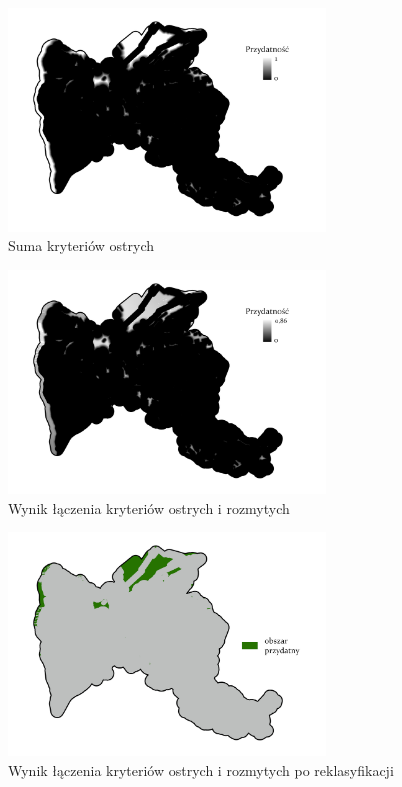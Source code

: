 \documentclass{article}
\begin{document}
\begin{figure}[H]
    \centering
    \includegraphics[width=0.75\textwidth]{img/ostre-layout.jpg}
    \caption*{Suma kryteriów ostrych}
\end{figure}

\begin{figure}[H]
    \centering
    \includegraphics[width=0.75\textwidth]{img/wynik.jpg}
    \caption*{Wynik łączenia kryteriów ostrych i rozmytych}
\end{figure}

\begin{figure}[H]
    \centering
    \includegraphics[width=0.75\textwidth]{img/wynik-po-reklasyfikacji.jpg}
    \caption*{Wynik łączenia kryteriów ostrych i rozmytych po reklasyfikacji}
\end{figure}
\end{document}
